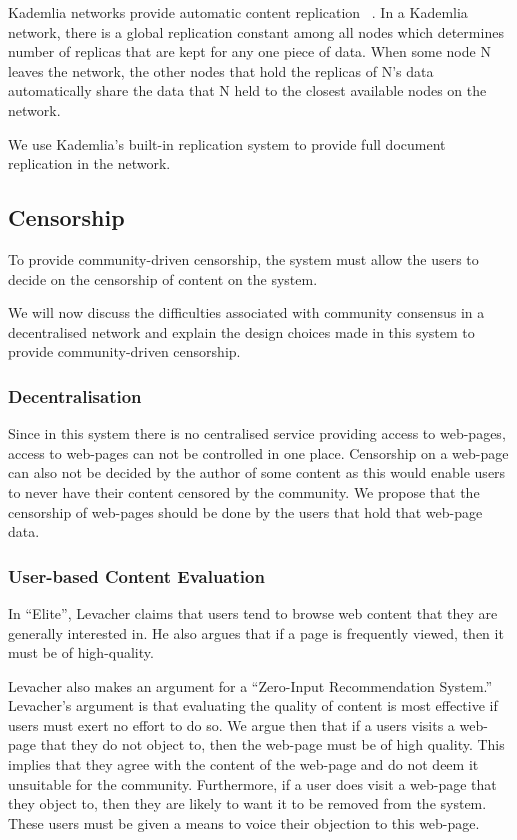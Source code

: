 Kademlia networks provide automatic content replication ~\cite{kademlia}. In a Kademlia network, there is a
global replication constant among all nodes which determines number of replicas that are kept for any
one piece of data. When some node N leaves the network, the other nodes that hold the replicas of N's data
automatically share the data that N held to the closest available nodes on the network.

We use Kademlia's built-in replication system to provide full document replication in the network.


\subsection{Censorship}

To provide community-driven censorship, the system must allow the users to decide on the censorship of content
on the system.

We will now discuss the difficulties associated with community consensus in a decentralised network and explain the
design choices made in this system to provide community-driven censorship.

\subsubsection{Decentralisation}

Since in this system there is no centralised service providing access to web-pages, access to web-pages can not be
controlled in one place.
Censorship on a web-page can also not be decided by the author of some content as this would enable users to never
have their content censored by the community.
We propose that the censorship of web-pages should be done by the users that hold that web-page data.

\subsubsection{User-based Content Evaluation}

In ``Elite'', Levacher claims that users tend to browse web content that they are generally interested in.
He also argues that if a page is frequently viewed, then it must be of high-quality.

Levacher also makes an argument for a ``Zero-Input Recommendation System.'' Levacher's argument is that evaluating the quality of
content is most effective if users must exert no effort to do so. We argue then that if a users visits a web-page that they do not
object to, then the web-page must be of high quality. This implies that they agree with the content of the web-page and do not deem
it unsuitable for the community. Furthermore, if a user does visit a web-page that they object to, then they are likely to want it to be removed from the system. These users must be given a means to voice their objection to this web-page.

